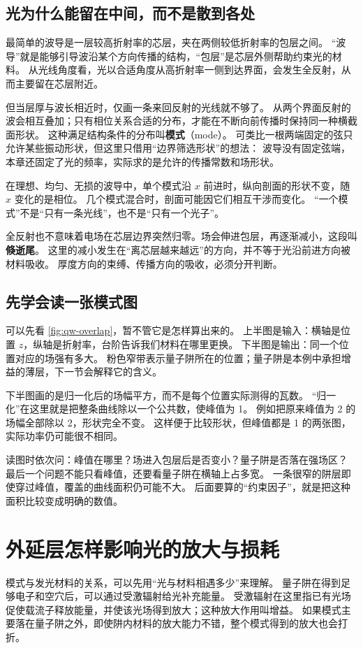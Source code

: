 \subsection{光为什么能留在中间，而不是散到各处}
最简单的波导是一层较高折射率的芯层，夹在两侧较低折射率的包层之间。
“波导”就是能够引导波沿某个方向传播的结构，“包层”是芯层外侧帮助约束光的材料。
从光线角度看，光以合适角度从高折射率一侧到达界面，会发生全反射，从而主要留在芯层附近。

但当层厚与波长相近时，仅画一条来回反射的光线就不够了。
从两个界面反射的波会相互叠加；只有相位关系合适的分布，才能在不断向前传播时保持同一种横截面形状。
这种满足结构条件的分布叫\textbf{模式}（mode）。
可类比一根两端固定的弦只允许某些振动形状，但这里只借用“边界筛选形状”的想法：
波导没有固定弦端，本章还固定了光的频率，实际求的是允许的传播常数和场形状。

在理想、均匀、无损的波导中，单个模式沿 $x$ 前进时，纵向剖面的形状不变，随 $x$ 变化的是相位。
几个模式混合时，剖面可能因它们相互干涉而变化。
“一个模式”不是“只有一条光线”，也不是“只有一个光子”。

全反射也不意味着电场在芯层边界突然归零。场会伸进包层，再逐渐减小，这段叫\textbf{倏逝尾}。
这里的减小发生在“离芯层越来越远”的方向，并不等于光沿前进方向被材料吸收。
厚度方向的束缚、传播方向的吸收，必须分开判断。

\subsection{先学会读一张模式图}
可以先看 \cref{fig:qw-overlap}，暂不管它是怎样算出来的。
上半图是输入：横轴是位置 $z$，纵轴是折射率，台阶告诉我们材料在哪里更换。
下半图是输出：同一个位置对应的场强有多大。
粉色窄带表示量子阱所在的位置；量子阱是本例中承担增益的薄层，下一节会解释它的含义。

下半图画的是归一化后的场幅平方，而不是每个位置实际测得的瓦数。
“归一化”在这里就是把整条曲线除以一个公共数，使峰值为 1。
例如把原来峰值为 2 的场幅全部除以 2，形状完全不变。
这样便于比较形状，但峰值都是 1 的两张图，实际功率仍可能很不相同。

读图时依次问：峰值在哪里？场进入包层后是否变小？量子阱是否落在强场区？
最后一个问题不能只看峰值，还要看量子阱在横轴上占多宽。
一条很窄的阱层即使穿过峰值，覆盖的曲线面积仍可能不大。
后面要算的“约束因子”，就是把这种面积比较变成明确的数值。

\section{外延层怎样影响光的放大与损耗}
模式与发光材料的关系，可以先用“光与材料相遇多少”来理解。
量子阱在得到足够电子和空穴后，可以通过受激辐射给光补充能量。
受激辐射在这里指已有光场促使载流子释放能量，并使该光场得到放大；这种放大作用叫增益。
如果模式主要落在量子阱之外，即使阱内材料的放大能力不错，整个模式得到的放大也会打折。

